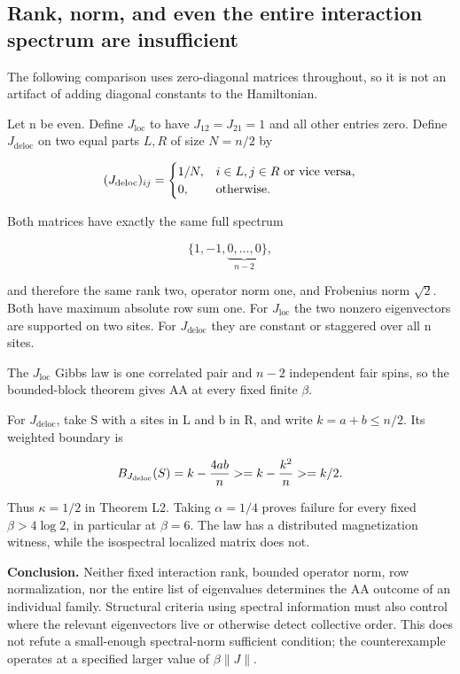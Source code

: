 \subsection{Rank, norm, and even the entire interaction spectrum are
insufficient}\label{proof:local_interactions:rank-norm-and-even-the-entire-interaction-spectrum-are-insufficient}

The following comparison uses zero-diagonal matrices throughout, so it
is not an artifact of adding diagonal constants to the Hamiltonian.

Let n be even. Define \(J_{\mathrm{loc}}\) to have \(J_{12}=J_{21}=1\)
and all other entries zero. Define \(J_{\mathrm{deloc}}\) on two equal
parts \(L,R\) of size \(N=n/2\) by

\[
(J_{\rm deloc})_{ij}=\begin{cases}1/N,&i\in L,j\in R\text{ or vice versa},\\0,&\text{otherwise}.\end{cases}
\]

Both matrices have exactly the same full spectrum

\[
\{1,-1,\underbrace{0,\ldots,0}_{n-2}\},
\]

and therefore the same rank two, operator norm one, and Frobenius norm
\(\sqrt{2}\). Both have maximum absolute row sum one. For
\(J_{\mathrm{loc}}\) the two nonzero eigenvectors are supported on two
sites. For \(J_{\mathrm{deloc}}\) they are constant or staggered over
all n sites.

The \(J_{\mathrm{loc}}\) Gibbs law is one correlated pair and \(n-2\)
independent fair spins, so the bounded-block theorem gives AA at every
fixed finite \(\beta\).

For \(J_{\mathrm{deloc}}\), take S with a sites in L and b in R, and
write \(k=a+b\le n/2\). Its weighted boundary is

\[
B_{J_{\rm deloc}}(S)=k-\frac{4ab}{n}
\ge k-\frac{k^2}{n}\ge k/2.
\]

Thus \(\kappa =1/2\) in Theorem L2. Taking \(\alpha =1/4\) proves
failure for every fixed \(\beta >4\log 2\), in particular at
\(\beta =6\). The law has a distributed magnetization witness, while the
isospectral localized matrix does not.

\textbf{Conclusion.} Neither fixed interaction rank, bounded operator
norm, row normalization, nor the entire list of eigenvalues determines
the AA outcome of an individual family. Structural criteria using
spectral information must also control where the relevant eigenvectors
live or otherwise detect collective order. This does not refute a
small-enough spectral-norm sufficient condition; the counterexample
operates at a specified larger value of \(\beta \lVert J\rVert\).

